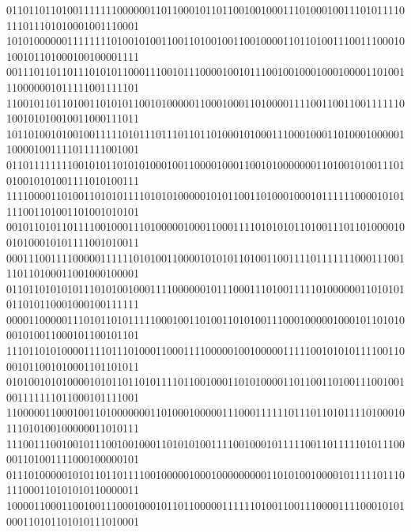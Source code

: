 \documentclass[10pt,\tflang,pdftex]{book}
\begin{document}
{{\begin{minipage}{\oldpwidth}
{{{{011011011010011111110000001101100010110110010010001110100010011101011110111011101010001001110001\\
101010000001111111101001010011001101001001100100001101101001110011100010100101101000100100001111\blue\\
001110110110111010101100011100101110000100101110010010001000100001101001110000001011111001111101\\
110010110110100110101011001010000011000100011010000111100110011001111110100101010010011000111011\blue\\
101101001010010011111010111011101101101000101000111000100011010001000001100001001111011111001001\\
011011111111001010110101010001001100001000110010100000001101001010011101010010101001111010100111\blue\\
111100001101001101010111101010100000101011001101000100010111111000010101111001101001101001010101\\
001011010110111100100011101000001000110001111010101011010011101101000010010100010101111001010011\blue\\
000111001111000001111110101001100001010101101001100111101111111000111001110110100011001000100001\\
011011010101011101010010001111000000101110001110100111110100000011010101011010110001000100111111\blue\\
000011000001110101101011111000100110100110101001110001000001000101101010001010011000101100101101\\
111011010100001111011101000110001111000001001000001111100101010111100110001011001010001101101011\blue\\
010100101010000101011011010111101100100011010100001101100110100111001001001111111011000101111001\\
110000011000100110100000001101000100000111000111111011101101011110100010111010100100000011010111\blue\\
111001110010010111001001000110101010011110010001011111001101111101011100001101001111000100000101\\
011101000001010110110111100100000100010000000001101010010000101111101110111000110101010110000011\blue\\
100001100011001001110001000101101100000111111010011001110000111100010101000110101101010111010001\\
}}}}
\end{minipage}}}
\end{document}
